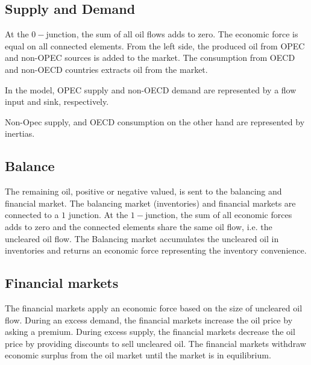 \subsection{Supply and Demand}
At the $0-$junction, the sum of all oil flows adds to zero.
The economic force is equal on all connected elements.
From the left side, the produced oil from OPEC and non-OPEC sources is added to the market.
The consumption from OECD and non-OECD countries extracts oil from the market.

In the model, OPEC supply and non-OECD demand are represented by a flow input and sink, respectively.


Non-Opec supply, and OECD consumption on the other hand are represented by inertias. 


\subsection{Balance}
The remaining oil, positive or negative valued, is sent to the balancing and financial market.
The balancing market (inventories) and financial markets are connected to a $1$ junction.
At the $1-$junction, the sum of all economic forces adds to zero and the connected elements share the same oil flow, i.e. the uncleared oil flow.
The Balancing market accumulates the uncleared oil in inventories and returns an economic force representing the inventory convenience.

\subsection{Financial markets}
The financial markets apply an economic force based on the size of uncleared oil flow. 
During an excess demand, the financial markets increase the oil price by asking a premium.
During excess supply, the financial markets decrease the oil price by providing discounts to sell uncleared oil.
The financial markets withdraw economic surplus from the oil market until the market is in equilibrium.





